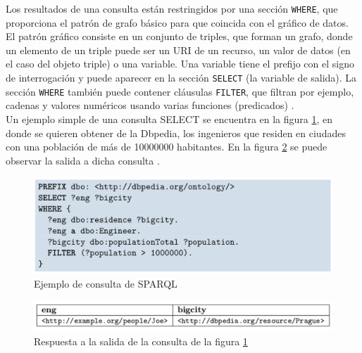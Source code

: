 Los resultados de una consulta están restringidos por una sección \texttt{WHERE}, que proporciona el patrón de grafo básico para que coincida con el gráfico de datos. El patrón gráfico consiste en un conjunto de triples, que forman un grafo, donde un elemento de un triple puede ser un URI de un recurso, un valor de datos (en el caso del objeto triple) o una variable. Una variable tiene el prefijo con el signo de interrogación y puede aparecer en la sección \texttt{SELECT} (la variable de salida). La sección \texttt{WHERE} también puede contener cláusulas \texttt{FILTER}, que filtran por ejemplo, cadenas y valores numéricos usando varias funciones (predicados) \cite{tesis-otro}.\\

Un ejemplo simple de una consulta SELECT se encuentra en la figura \ref{fig:ejemplo-sparql}, en donde se quieren obtener de la Dbpedia, los ingenieros que residen en ciudades con una población de más de 10000000 habitantes. En la figura \ref{fig:salida-sparql} se puede observar la salida a dicha consulta \cite{tesis-otro}.

\begin{figure}[H]
	\centering
	\includegraphics[width=1\linewidth]{imagenes/capitulo3/consulta}
	\caption{Ejemplo de consulta de SPARQL \cite{tesis-otro}}
	\label{fig:ejemplo-sparql}
\end{figure}

\begin{figure}[H]
	\centering
	\includegraphics[width=1\linewidth]{imagenes/capitulo3/salida-sparql}
	\caption{Respuesta a la salida de la consulta de la figura \ref{fig:ejemplo-sparql}}
	\label{fig:salida-sparql}
\end{figure}









